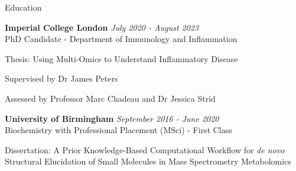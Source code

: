 \documentclass{resume}
\begin{document}

\begin{rSection}{Education}

\vspace{1pt plus 1pt}
{\bf Imperial College London} \hfill {\em July 2020 - August 2023} 
\\ PhD Candidate - Department of Immunology and Inflammation

\vspace{2pt plus 1pt minus 1pt}
\item Thesis: Using Multi-Omics to Understand Inflammatory Disease
\item Supervised by Dr James Peters
\item Assessed by Professor Marc Chadeau and Dr Jessica Strid

\smallskip

{\bf University of Birmingham} \hfill {\em September 2016 - June 2020} 
\\ Biochemistry with Professional Placement (MSci) - First Class

\vspace{2pt plus 1pt minus 1pt}
\item Dissertation: A Prior Knowledge-Based Computational Workflow for \textit{de novo} Structural Elucidation of Small Molecules in Mass Spectrometry Metabolomics

\end{rSection}

\end{document}
